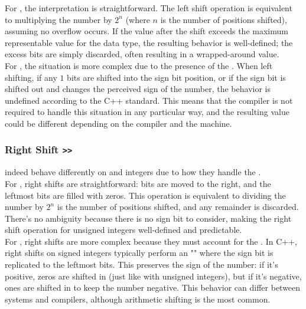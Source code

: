 For {\color{blue}{unsigned integers}}, the interpretation is straightforward. The left shift operation is equivalent to multiplying the number by $2^n$ (where $n$ is the number of positions shifted), assuming no overflow occurs. If the value after the shift exceeds the maximum representable value for the data type, the resulting behavior is well-defined; the excess bits are simply discarded, often resulting in a wrapped-around value.\\

For {\color{blue}{signed integers}}, the situation is more complex due to the presence of the {\color{blue}{sign bit}}. When left shifting, if any $1$ bits are shifted into the sign bit position, or if the sign bit is shifted out and changes the perceived sign of the number, the behavior is undefined according to the C++ standard. This means that the compiler is not required to handle this situation in any particular way, and the resulting value could be different depending on the compiler and the machine.

\subsubsection{Right Shift {\colorbox{CodeBackground}{\lstinline|>>|}}}
{\color{blue}{Right shifts}} indeed behave differently on {\color{blue}{signed}} and {\color{blue}{unsigned}} integers due to how they handle the {\color{blue}{sign bit}}.\\

For {\color{blue}{unsigned integers}}, right shifts are straightforward: bits are moved to the right, and the leftmost bits are filled with zeros. This operation is equivalent to dividing the number by $2^n$ is the number of positions shifted, and any remainder is discarded. There's no ambiguity because there is no sign bit to consider, making the right shift operation for unsigned integers well-defined and predictable.\\

For {\color{blue}{signed integers}}, right shifts are more complex because they must account for the {\color{blue}{sign bit}}. In C++, right shifts on signed integers typically perform an "{\color{blue}{arithmetic shift}}" where the sign bit is replicated to the leftmost bits. This preserves the sign of the number: if it's positive, zeros are shifted in (just like with unsigned integers), but if it's negative, ones are shifted in to keep the number negative. This behavior can differ between systems and compilers, although arithmetic shifting is the most common.

